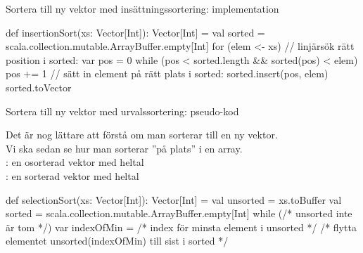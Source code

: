 \begin{Slide}{Sortera till ny vektor med insättningssortering: implementation} %
\begin{Code}
def insertionSort(xs: Vector[Int]): Vector[Int] = {
  val sorted = scala.collection.mutable.ArrayBuffer.empty[Int]
  for (elem <- xs) {
     // linjärsök rätt position i sorted:
     var pos = 0
     while (pos < sorted.length && sorted(pos) < elem) {
       pos += 1
     }
     // sätt in element på rätt plats i sorted:
     sorted.insert(pos, elem)
  }
  sorted.toVector
}
\end{Code}
\end{Slide}





\begin{Slide}{Sortera till ny vektor med urvalssortering: pseudo-kod}

{\SlideFontSmall Det är nog lättare att förstå  om man sorterar till en ny vektor. \\ Vi ska sedan se hur man sorterar ''på plats''  i en  array.\\} \vspace{1em}
: en osorterad vektor med heltal \\
: en sorterad vektor med heltal
\begin{Code}
def selectionSort(xs: Vector[Int]): Vector[Int] = {
  val unsorted = xs.toBuffer
  val sorted = scala.collection.mutable.ArrayBuffer.empty[Int]
  while (/* unsorted inte är tom */) {
    var indexOfMin = /* index för minsta element i unsorted */
    /* flytta elementet unsorted(indexOfMin) till sist i sorted */
  }
}
\end{Code}
\end{Slide}

